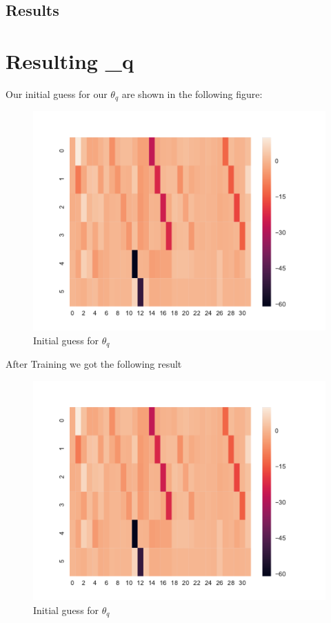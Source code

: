 \subsection{Results}

\section{Resulting \theta_q}
Our initial guess for our $\theta_q$ are shown in the following figure:

\begin{figure}[H]
	\centering
    \includegraphics[scale=0.7]{fig//theta_q.pdf}
	\caption{Initial guess for $\theta_q$}
	\label{img:theta_guess}
\end{figure}

After Training we got the following result

\begin{figure}[H]
	\centering
    \includegraphics[scale=0.7]{fig//theta_q.pdf}
	\caption{Initial guess for $\theta_q$}
	\label{img:theta_guess}
\end{figure}





